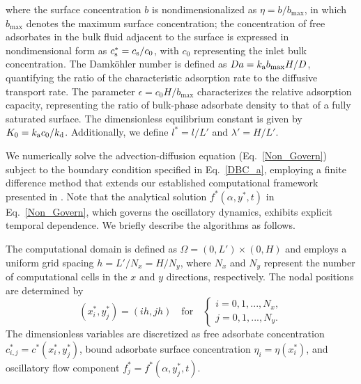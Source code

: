 \documentclass[lineno]{JFM-FLM_Au}
\begin{document}
{where the surface concentration $b$ is nondimensionalized as $\eta = b / b_{\max}$, in which $b_{\max}$ denotes the maximum surface concentration; the concentration of free adsorbates in the bulk fluid adjacent to the surface is expressed in nondimensional form as $c_{\rm s}^* = c_{\rm s}/c_0$, with $c_0$ representing the inlet bulk concentration.
The Damköhler number is defined as $Da = k_{\rm a} b_{\max} H / D$, quantifying the ratio of the characteristic adsorption rate to the diffusive transport rate. The parameter $\epsilon = c_0 H / b_{\max}$ characterizes the relative adsorption capacity, representing the ratio of bulk-phase adsorbate density to that of a fully saturated surface. The dimensionless equilibrium constant is given by $K_0 = k_{\rm a} c_0 / k_{\rm d}$. Additionally, we define $l^* = l / L'$ and $\lambda' = H / L'$.

We numerically solve the advection-diffusion equation (Eq.~\eqref{Non_Govern}) subject to the boundary condition specified in Eq.~\eqref{DBC_a}, employing a finite difference method that extends our established computational framework presented in \cite{Huang2023}. Note that the analytical solution $ f^*(\alpha, y^*, t) $ in Eq.~\eqref{Non_Govern}, which governs the oscillatory dynamics, exhibits explicit temporal dependence. We briefly describe the algorithms as follows.

The computational domain is defined as $\Omega = (0, L') \times (0, H)$ and employs a uniform grid spacing $h = L'/N_x = H/N_y$, where $N_x$ and $N_y$ represent the number of computational cells in the $x$ and $y$ directions, respectively. The nodal positions are determined by 
\begin{equation}
 (x_i^*, y_j^*) = (ih, jh) \quad \text{for} \quad 
\begin{cases} 
i = 0,1,...,N_x, \\
j = 0,1,...,N_y. 
\end{cases}   
\end{equation}
The dimensionless variables are discretized as free adsorbate concentration $c^*_{i,j}=c^*(x^*_i,y^*_j)$, bound adsorbate surface concentration $\eta_{i}=\eta(x^*_i)$, and oscillatory flow component $ f_j^* = f^*(\alpha, y_j^*, t)$. 


}
\end{document}
